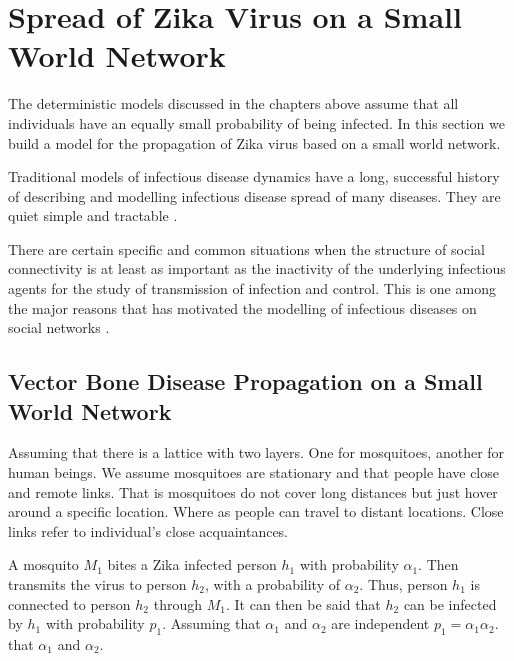 \chapter{ Spread of Zika Virus on a Small World Network }

The deterministic models discussed in the chapters above assume that all individuals have an equally small probability of being infected. In this section we build a model for the propagation of Zika virus based on a small world network.

Traditional models of infectious disease dynamics have a long, successful history of describing and modelling infectious disease spread of many diseases. They are quiet simple and tractable \citep{fu2013propagation}.

There are certain specific and common situations when the structure of social connectivity is at least as important as the inactivity of the underlying infectious agents for the study of transmission of infection and control. This is one among the major reasons that has motivated the modelling of infectious diseases on social networks \cite{fu2013propagation}.



\section{ Vector Bone Disease Propagation on a Small World Network}
Assuming that there is a lattice with two layers. One for mosquitoes, another for human beings. We assume mosquitoes are stationary and that people have close and remote links. That is mosquitoes  do not cover long distances but just hover around a specific location. Where as people can travel to distant locations. Close links refer to individual's close acquaintances. 
 
A mosquito $M_1$ bites a Zika infected person $h_1$ with probability $\alpha_1$. Then transmits the virus to person $h_2$, with a probability of $\alpha_2$. Thus, person $h_1$ is connected to  person $h_2$ through $M_1$. It can then be said that $h_2$ can be infected by $h_1$ with probability $p_1$. Assuming that $\alpha_1 $ and $\alpha_2$ are independent  $p_1 =  \alpha_1 \alpha_2$. 
that $\alpha_1$ and $\alpha_2$.

